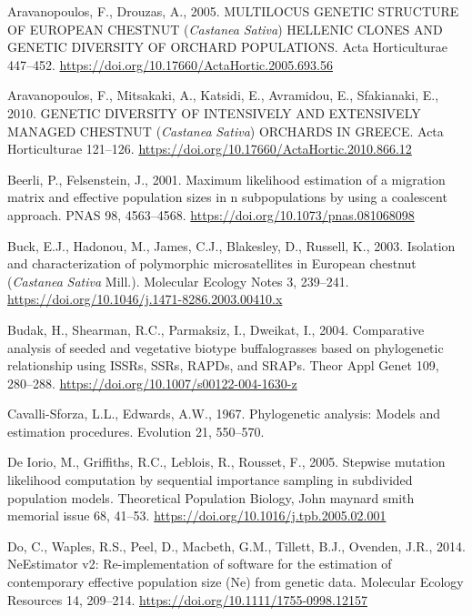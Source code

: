 \documentclass[12pt,a4paper,]{report}
\begin{document}
\leavevmode\hypertarget{ref-aravanopoulos_multilocus_2005}{}%
Aravanopoulos, F., Drouzas, A., 2005. MULTILOCUS GENETIC STRUCTURE OF
EUROPEAN CHESTNUT (\emph{Castanea} \emph{Sativa}) HELLENIC CLONES AND
GENETIC DIVERSITY OF ORCHARD POPULATIONS. Acta Horticulturae 447--452.
\url{https://doi.org/10.17660/ActaHortic.2005.693.56}

\leavevmode\hypertarget{ref-aravanopoulos_genetic_2010}{}%
Aravanopoulos, F., Mitsakaki, A., Katsidi, E., Avramidou, E.,
Sfakianaki, E., 2010. GENETIC DIVERSITY OF INTENSIVELY AND EXTENSIVELY
MANAGED CHESTNUT (\emph{Castanea} \emph{Sativa}) ORCHARDS IN GREECE.
Acta Horticulturae 121--126.
\url{https://doi.org/10.17660/ActaHortic.2010.866.12}

\leavevmode\hypertarget{ref-beerli_maximum_2001}{}%
Beerli, P., Felsenstein, J., 2001. Maximum likelihood estimation of a
migration matrix and effective population sizes in n subpopulations by
using a coalescent approach. PNAS 98, 4563--4568.
\url{https://doi.org/10.1073/pnas.081068098}

\leavevmode\hypertarget{ref-buck_isolation_2003}{}%
Buck, E.J., Hadonou, M., James, C.J., Blakesley, D., Russell, K., 2003.
Isolation and characterization of polymorphic microsatellites in
European chestnut (\emph{Castanea} \emph{Sativa} Mill.). Molecular
Ecology Notes 3, 239--241.
\url{https://doi.org/10.1046/j.1471-8286.2003.00410.x}

\leavevmode\hypertarget{ref-budak_comparative_2004}{}%
Budak, H., Shearman, R.C., Parmaksiz, I., Dweikat, I., 2004. Comparative
analysis of seeded and vegetative biotype buffalograsses based on
phylogenetic relationship using ISSRs, SSRs, RAPDs, and SRAPs. Theor
Appl Genet 109, 280--288.
\url{https://doi.org/10.1007/s00122-004-1630-z}

\leavevmode\hypertarget{ref-cavalli1967phylogenetic}{}%
Cavalli-Sforza, L.L., Edwards, A.W., 1967. Phylogenetic analysis: Models
and estimation procedures. Evolution 21, 550--570.

\leavevmode\hypertarget{ref-de_iorio_stepwise_2005}{}%
De Iorio, M., Griffiths, R.C., Leblois, R., Rousset, F., 2005. Stepwise
mutation likelihood computation by sequential importance sampling in
subdivided population models. Theoretical Population Biology, John
maynard smith memorial issue 68, 41--53.
\url{https://doi.org/10.1016/j.tpb.2005.02.001}

\leavevmode\hypertarget{ref-Do2014}{}%
Do, C., Waples, R.S., Peel, D., Macbeth, G.M., Tillett, B.J., Ovenden,
J.R., 2014. NeEstimator v2: Re-implementation of software for the
estimation of contemporary effective population size (Ne) from genetic
data. Molecular Ecology Resources 14, 209--214.
\url{https://doi.org/10.1111/1755-0998.12157}
\end{document}
